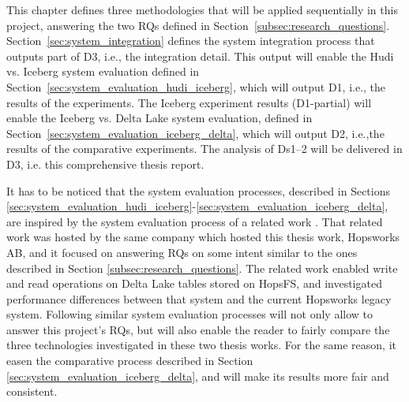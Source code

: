 This chapter defines three methodologies that will be applied sequentially in this project, answering the two \glspl{RQ} defined in Section~\ref{subsec:research_questions}. Section~\ref{sec:system_integration} defines the system integration process that outputs part of \gls{D}3, i.e., the integration detail. This output will enable the Hudi vs. Iceberg system evaluation defined in Section~\ref{sec:system_evaluation_hudi_iceberg}, which will output \gls{D}1, i.e., the results of the experiments. The Iceberg experiment results (\gls{D}1-partial) will enable the Iceberg vs. Delta Lake system evaluation, defined in Section~\ref{sec:system_evaluation_iceberg_delta}, which will output \gls{D}2, i.e.,the results of the comparative experiments. The analysis of \glspl{D}1--2 will be delivered in \gls{D}3, i.e. this comprehensive thesis report.

It has to be noticed that the system evaluation processes, described in Sections \ref{sec:system_evaluation_hudi_iceberg}-\ref{sec:system_evaluation_iceberg_delta}, are inspired by the system evaluation process of a related work \cite{manfrediReducingReadWrite2024}. That related work was hosted by the same company which hosted this thesis work, Hopsworks AB, and it focused on answering \glspl{RQ} on some intent similar to the ones described in Section \ref{subsec:research_questions}. The related work enabled write and read operations on Delta Lake tables stored on \gls{HopsFS}, and investigated performance differences between that system and the current Hopsworks legacy system. Following similar system evaluation processes will not only allow to answer this project's \glspl{RQ}, but will also enable the reader to fairly compare the three technologies investigated in these two thesis works. For the same reason, it easen the comparative process described in Section \ref{sec:system_evaluation_iceberg_delta}, and will make its results more fair and consistent.